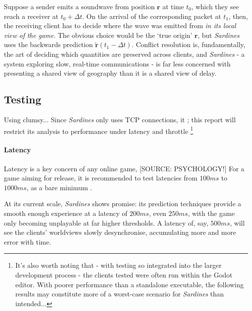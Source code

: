 \documentclass[a4paper, 10pt]{article}
\begin{document}
\begin{flushleft}
\vspace{5pt}\noindent
Suppose a sender emits a soundwave from position $\mathbf{r}$ at time $t_0$, which they see reach a receiver at $t_0+\Delta t$. On the arrival of the corresponding packet at $t_1$, then, the receiving client has to decide where the wave was emitted from \textit{in its local view of the game}. The obvious choice would be the `true origin' $\mathbf{r}$, but \textit{Sardines} uses the backwards prediction $\mathbf{\tilde{r}}(t_1-\Delta t)$. Conflict resolution is, fundamentally, the art of deciding which quantities are preserved across clients, and \textit{Sardines} - a system exploring slow, real-time communications - is far less concerned with presenting a shared view of geography than it is a shared view of delay.

\subsection*{Testing}\label{Testing}

\vspace{5pt}
Using clumsy...
Since \textit{Sardines} only uses TCP connections, it ; this report will restrict its analysis to performance under latency and throttle \footnote{It's also worth noting that - with testing so integrated into the larger development process - the clients tested were often run within the Godot editor. With poorer performance than a standalone executable, the following results may constitute more of a worst-case scenario for \textit{Sardines} than intended...}

\paragraph{Latency} Latency is a key concern of any online game, [SOURCE: PSYCHOLOGY!]
For a game aiming for release, it is recommended to test latencies from $100ms$ to $1000ms$, as a bare minimum \citep{unityNTWK}.

\vspace{5pt}\noindent
At its current scale, \textit{Sardines} shows promise: its prediction techniques provide a smooth enough experience at a latency of $200ms$, even $250ms$, with the game only becoming unplayable at far higher thresholds. A latency of, say, $500ms$, will see the clients' worldviews slowly desynchronise, accumulating more and more error with time. %



\end{flushleft}
\end{document}
